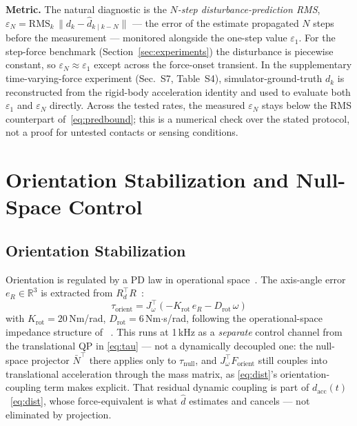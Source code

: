 \documentclass[journal]{IEEEtran}
\newcommand{\dhat}{\hat{d}}
\begin{document}
\textbf{Metric.} The natural diagnostic is the \emph{$N$-step
disturbance-prediction RMS}, $\varepsilon_N=\mathrm{RMS}_k\,\|d_k-\dhat_{k\mid
k-N}\|$ --- the error of the estimate propagated $N$ steps before the
measurement --- monitored alongside the one-step value $\varepsilon_1$. For
the step-force benchmark (Section~\ref{sec:experiments}) the disturbance is
piecewise constant, so $\varepsilon_N\approx\varepsilon_1$ except across the
force-onset transient. In the supplementary time-varying-force experiment
(Sec.~S7, Table~S4), simulator-ground-truth $d_k$ is reconstructed from the
rigid-body acceleration identity and used to evaluate both $\varepsilon_1$
and $\varepsilon_N$ directly. Across the tested rates, the measured
$\varepsilon_N$ stays below the RMS counterpart of~\eqref{eq:predbound}; this
is a numerical check over the stated protocol, not a proof for untested
contacts or sensing conditions.

\section{Orientation Stabilization and Null-Space Control}

\subsection{Orientation Stabilization}

Orientation is regulated by a PD law in operational
space~\cite{khatib1987unified}.
The axis-angle error $e_R\in\mathbb{R}^3$ is extracted from
$R_d^\top R$~\cite{siciliano2009robotics}:
\begin{equation}\label{eq:torient}
  \tau_{\text{orient}} = J_\omega^\top(-K_{\text{rot}}\,e_R - D_{\text{rot}}\,\omega)
\end{equation}
with $K_{\text{rot}}=20$\,Nm/rad, $D_{\text{rot}}=6$\,Nm$\cdot$s/rad,
following the operational-space impedance structure of~%
\cite{khatib1987unified,albu2007unified}.
This runs at 1\,kHz as a \emph{separate} control channel from the
translational QP in \eqref{eq:tau} --- not a dynamically decoupled one:
the null-space projector $\bar N^\top$ there applies only to
$\tau_{\text{null}}$, and $J_\omega^\top F_{\text{orient}}$ still couples
into translational acceleration through the mass matrix, as
\eqref{eq:dist}'s orientation-coupling term makes explicit. That residual
dynamic coupling is part of $d_{\text{acc}}(t)$~\eqref{eq:dist}, whose
force-equivalent is what $\dhat$ estimates and cancels --- not eliminated
by projection.
\end{document}
